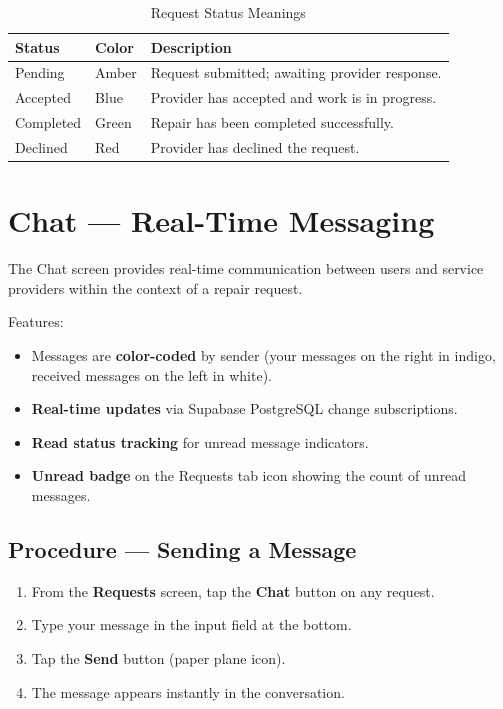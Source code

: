 \documentclass[10pt, a4paper, oneside]{report}
\begin{document}
\begin{table}[H]
\centering
\caption{Request Status Meanings}
\label{tab:request-status}
\begin{tabularx}{\textwidth}{l l X}
  \toprule
  \textbf{Status} & \textbf{Color} & \textbf{Description} \\
  \midrule
  Pending   & \textcolor{warningamber}{Amber} & Request submitted; awaiting provider response. \\
  Accepted  & \textcolor{ieeeblue}{Blue}      & Provider has accepted and work is in progress. \\
  Completed & \textcolor{successgreen}{Green}  & Repair has been completed successfully. \\
  Declined  & \textcolor{dangerred}{Red}       & Provider has declined the request. \\
  \bottomrule
\end{tabularx}
\end{table}

\section{Chat --- Real-Time Messaging}
\label{sec:chat}

The Chat screen provides real-time communication between users and service providers within the context of a repair request.

Features:
\begin{itemize}[leftmargin=*, nosep]
  \item Messages are \textbf{color-coded} by sender (your messages on the right in indigo, received messages on the left in white).
  \item \textbf{Real-time updates} via Supabase PostgreSQL change subscriptions.
  \item \textbf{Read status tracking} for unread message indicators.
  \item \textbf{Unread badge} on the Requests tab icon showing the count of unread messages.
\end{itemize}

\subsection*{Procedure --- Sending a Message}
\begin{enumerate}[leftmargin=*, nosep]
  \item From the \textbf{Requests} screen, tap the \textbf{Chat} button on any request.
  \item Type your message in the input field at the bottom.
  \item Tap the \textbf{Send} button (paper plane icon).
  \item The message appears instantly in the conversation.
\end{enumerate}
\end{document}
